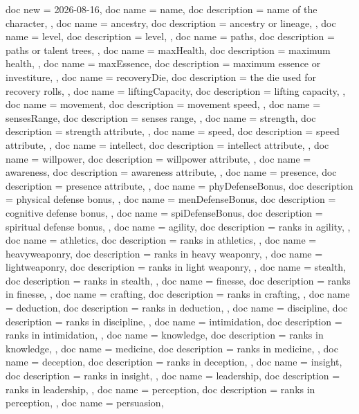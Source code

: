 \documentclass[article,ariandor]{plotweaver}
\begin{document}
\begin{docKeys}[
  doc keypath = charsheet,
  doc parameter = {=\meta{text}},
]{
{
  doc new = 2026-08-16,
  doc name = name,
  doc description = name of the character,
},
{
  doc name = ancestry,
  doc description = ancestry or lineage,
},
{
  doc name = level,
  doc description = level,
},
{
  doc name = paths,
  doc description = paths or talent trees,
},
{
  doc name = maxHealth,
  doc description = maximum health,
},
{
  doc name = maxEssence,
  doc description = maximum essence or investiture,
},
{
  doc name = recoveryDie,
  doc description = the die used for recovery rolls,
},
{
  doc name = liftingCapacity,
  doc description = lifting capacity,
},
{
  doc name = movement,
  doc description = movement speed,
},
{
  doc name = sensesRange,
  doc description = senses range,
},
{
  doc name = strength,
  doc description = strength attribute,
},
{
  doc name = speed,
  doc description = speed attribute,
},
{
  doc name = intellect,
  doc description = intellect attribute,
},
{
  doc name = willpower,
  doc description = willpower attribute,
},
{
  doc name = awareness,
  doc description = awareness attribute,
},
{
  doc name = presence,
  doc description = presence attribute,
},
{
  doc name = phyDefenseBonus,
  doc description = physical defense bonus,
},
{
  doc name = menDefenseBonus,
  doc description = cognitive defense bonus,
},
{
  doc name = spiDefenseBonus,
  doc description = spiritual defense bonus,
},
{
  doc name = agility,
  doc description = ranks in agility,
},
{
  doc name = athletics,
  doc description = ranks in athletics,
},
{
  doc name = heavyweaponry,
  doc description = ranks in heavy weaponry,
},
{
  doc name = lightweaponry,
  doc description = ranks in light weaponry,
},
{
  doc name = stealth,
  doc description = ranks in stealth,
},
{
  doc name = finesse,
  doc description = ranks in finesse,
},
{
  doc name = crafting,
  doc description = ranks in crafting,
},
{
  doc name = deduction,
  doc description = ranks in deduction,
},
{
  doc name = discipline,
  doc description = ranks in discipline,
},
{
  doc name = intimidation,
  doc description = ranks in intimidation,
},
{
  doc name = knowledge,
  doc description = ranks in knowledge,
},
{
  doc name = medicine,
  doc description = ranks in medicine,
},
{
  doc name = deception,
  doc description = ranks in deception,
},
{
  doc name = insight,
  doc description = ranks in insight,
},
{
  doc name = leadership,
  doc description = ranks in leadership,
},
{
  doc name = perception,
  doc description = ranks in perception,
},
{
  doc name = persuasion,
}}
\end{docKeys}
\end{document}
